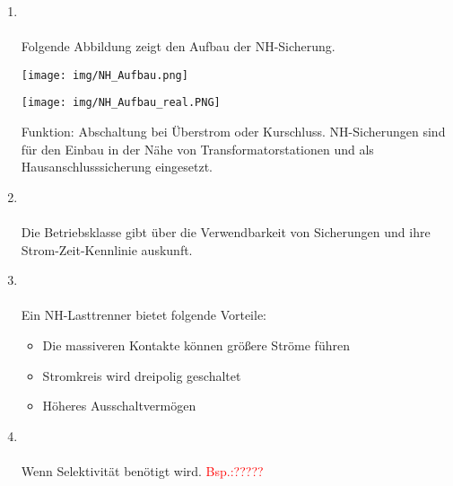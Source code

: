 \begin{enumerate}
    \item   {}\\\\
            Folgende Abbildung zeigt den Aufbau der NH-Sicherung.
            
            \begin{minipage}[t]{0.5\textwidth}
                \centering
                \texttt{[image: img/NH\_Aufbau.png]}
            \end{minipage}
            \begin{minipage}[t]{0.5\textwidth}
                \centering
                \texttt{[image: img/NH\_Aufbau\_real.PNG]}
            \end{minipage}

            Funktion: Abschaltung bei Überstrom oder Kurschluss. NH-Sicherungen sind für den Einbau in der Nähe von Transformatorstationen 
            und als Hausanschlusssicherung eingesetzt.

    \item   {} \\\\
            Die Betriebsklasse gibt über die Verwendbarkeit von Sicherungen und ihre Strom-Zeit-Kennlinie auskunft.

    \item   {} \\\\
            Ein NH-Lasttrenner bietet folgende Vorteile:
            \begin{itemize}
                \item Die massiveren Kontakte können größere Ströme führen
                \item Stromkreis wird dreipolig geschaltet
                \item Höheres Ausschaltvermögen
            \end{itemize}      

    \item   {}\\\\
            Wenn Selektivität benötigt wird. \textcolor{red}{Bsp.:?????}


\end{enumerate}
